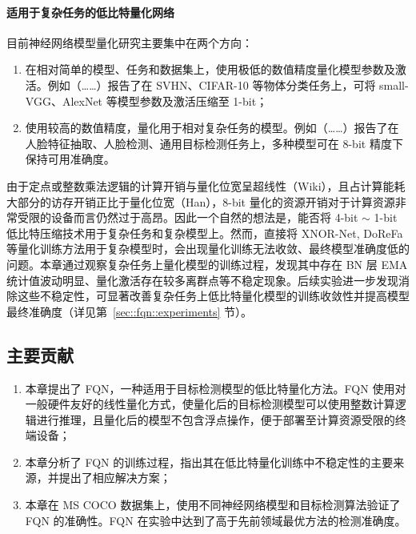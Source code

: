 \paragraph{适用于复杂任务的低比特量化网络}
目前神经网络模型量化研究主要集中在两个方向：
\begin{enumerate}[1)]
  \item 在相对简单的模型、任务和数据集上，使用极低的数值精度量化模型参数及激活。例如（……）报告了在 SVHN、CIFAR-10 等物体分类任务上，可将 small-VGG、AlexNet 等模型参数及激活压缩至 1-bit；
  \item 使用较高的数值精度，量化用于相对复杂任务的模型。例如（……）报告了在人脸特征抽取、人脸检测、通用目标检测任务上，多种模型可在 8-bit 精度下保持可用准确度。
\end{enumerate}

由于定点或整数乘法逻辑的计算开销与量化位宽呈超线性（Wiki），且占计算能耗大部分的访存开销正比于量化位宽（Han），8-bit 量化的资源开销对于计算资源非常受限的设备而言仍然过于高昂。因此一个自然的想法是，能否将 4-bit $\sim$ 1-bit 低比特压缩技术用于复杂任务和复杂模型上。然而，直接将 XNOR-Net, DoReFa 等量化训练方法用于复杂模型时，会出现量化训练无法收敛、最终模型准确度低的问题。本章通过观察复杂任务上量化模型的训练过程，发现其中存在 BN 层 EMA 统计值波动明显、量化激活存在较多离群点等不稳定现象。后续实验进一步发现消除这些不稳定性，可显著改善复杂任务上低比特量化模型的训练收敛性并提高模型最终准确度（详见第~\ref{sec::fqn::experiments} 节）。
\subsection{主要贡献}
\begin{enumerate}
  \item 本章提出了 FQN，一种适用于目标检测模型的低比特量化方法。FQN 使用对一般硬件友好的线性量化方式，使量化后的目标检测模型可以使用整数计算逻辑进行推理，且量化后的模型不包含浮点操作，便于部署至计算资源受限的终端设备；
  \item 本章分析了 FQN 的训练过程，指出其在低比特量化训练中不稳定性的主要来源，并提出了相应解决方案；
  \item 本章在 MS COCO 数据集上，使用不同神经网络模型和目标检测算法验证了 FQN 的准确性。FQN 在实验中达到了高于先前领域最优方法的检测准确度。
\end{enumerate}
